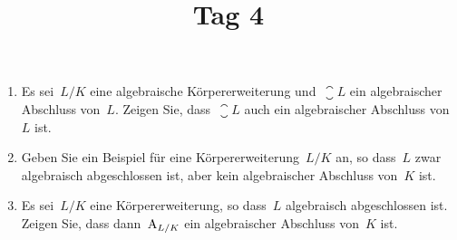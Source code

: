 \documentclass{scrartcl}
\title{Tag 4}
\author{}
\date{}
\begin{document}
\maketitle
\vspace{-6em}

\begin{exercise}
  \begin{enumerate}
    \item
      Es sei~$L/K$ eine algebraische Körpererweiterung und~$\closure{L}$ ein algebraischer Abschluss von~$L$.
      Zeigen Sie, dass~$\closure{L}$ auch ein algebraischer Abschluss von~$L$ ist.
    \item
      Geben Sie ein Beispiel für eine Körpererweiterung~$L/K$ an, so dass~$L$ zwar algebraisch abgeschlossen ist, aber kein algebraischer Abschluss von~$K$ ist.
    \item
      Es sei~$L/K$ eine Körpererweiterung, so dass~$L$ algebraisch abgeschlossen ist.
      Zeigen Sie, dass dann~$\operatorname{A}_{L/K}$ ein algebraischer Abschluss von~$K$ ist.
  \end{enumerate}
\end{exercise}

%
\end{document}
